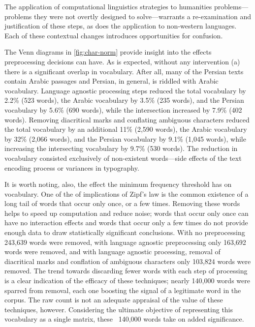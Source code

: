 \documentclass[12pt, oneside]{report}
\begin{document}
The application of computational linguistics strategies to humanities problems---problems they were not overtly designed to solve---warrants a re-examination and justification of these steps, as does the application to non-western languages.
Each of these contextual changes introduces opportunities for confusion.
\par
The Venn diagrams in \autoref{fig:char-norm} provide insight into the effects preprocessing decisions can have.
As is expected, without any intervention (a) there is a significant overlap in vocabulary.
After all, many of the Persian texts contain Arabic passages and Persian, in general, is riddled with Arabic vocabulary.
Language agnostic processing steps reduced the total vocabulary by 2.2\% (523 words), the Arabic vocabulary by 3.5\% (235 words), and the Persian vocabulary by 5.6\% (690 words), while the intersection increased by 7.9\% (402 words).
Removing diacritical marks and conflating ambiguous characters reduced the total vocabulary by an additional 11\% (2,590 words), the Arabic vocabulary by 32\% (2,066 words), and the Persian vocabulary by 9.1\% (1,045 words), while increasing the intersecting vocabulary by 9.7\% (530 words).
The reduction in vocabulary consisted exclusively of non-existent words---side effects of the text encoding process or variances in typography.
\par
It is worth noting, also, the effect the minimum frequency threshold has on vocabulary.
One of the of implications of Zipf's law is the common existence of a long tail of words that occur only once, or a few times.
Removing these words helps to speed up computation and reduce noise; words that occur only once can have no interaction effects and words that occur only a few times do not provide enough data to draw statistically significant conclusions.
With no preprocessing 243,639 words were removed, with language agnostic preprocessing only 163,692 words were removed, and with language agnostic processing, removal of diacritical marks and conflation of ambiguous characters only 103,824 words were removed.
The trend towards discarding fewer words with each step of processing is a clear indication of the efficacy of these techniques; nearly 140,000 words were sparred from removal, each one boosting the signal of a legitimate word in the corpus.
The raw count is not an adequate appraisal of the value of these techniques, however.
Considering the ultimate objective of representing this vocabulary as a single matrix, these ~140,000 words take on added significance.
\par
\end{document}
